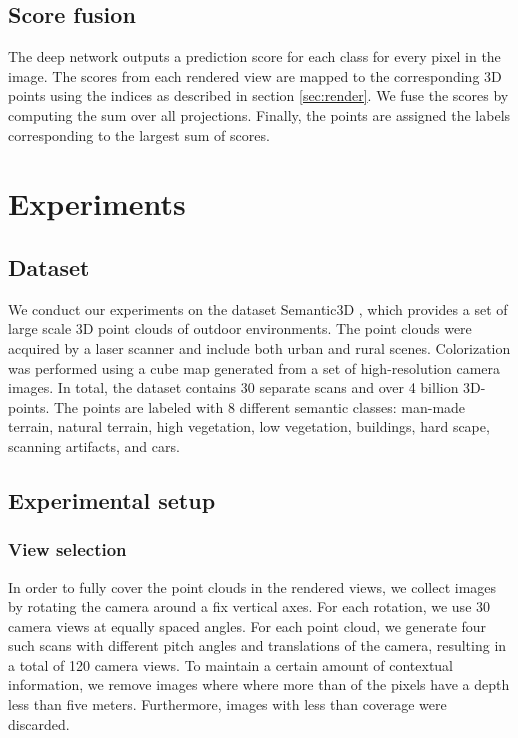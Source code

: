 \documentclass[runningheads,a4paper]{llncs}
\begin{document}
\subsection{Score fusion}
The deep network outputs a prediction score for each class for every pixel in the image. The scores from each rendered view are mapped to the corresponding 3D points using the indices  as described in section \ref{sec:render}. We fuse the scores by computing the sum over all projections. Finally, the points are assigned the labels corresponding to the largest sum of scores.



\section{Experiments}

\subsection{Dataset}
We conduct our experiments on the dataset Semantic3D \cite{hackel2017semantic3d}, which provides a set of large scale 3D point clouds of outdoor environments. The point clouds were acquired by a laser scanner and include both urban and rural scenes. Colorization was performed using a cube map generated from a set of high-resolution camera images. In total, the dataset contains 30 separate scans and over 4 billion 3D-points. The points are labeled with 8 different semantic classes: man-made terrain, natural terrain, high vegetation, low vegetation, buildings, hard scape, scanning artifacts, and cars. 

 
\subsection{Experimental setup}

\subsubsection{View selection}
In order to fully cover the point clouds in the rendered views, we collect images by rotating the camera  around a fix vertical axes. For each  rotation, we use 30 camera views at equally spaced angles. For each point cloud, we generate four such scans with different pitch angles and translations of the camera, resulting in a total of 120 camera views. To maintain a certain amount of contextual information, we remove images where where more than  of the pixels have a depth less than five meters. Furthermore, images with less than  coverage were discarded.
\end{document}
